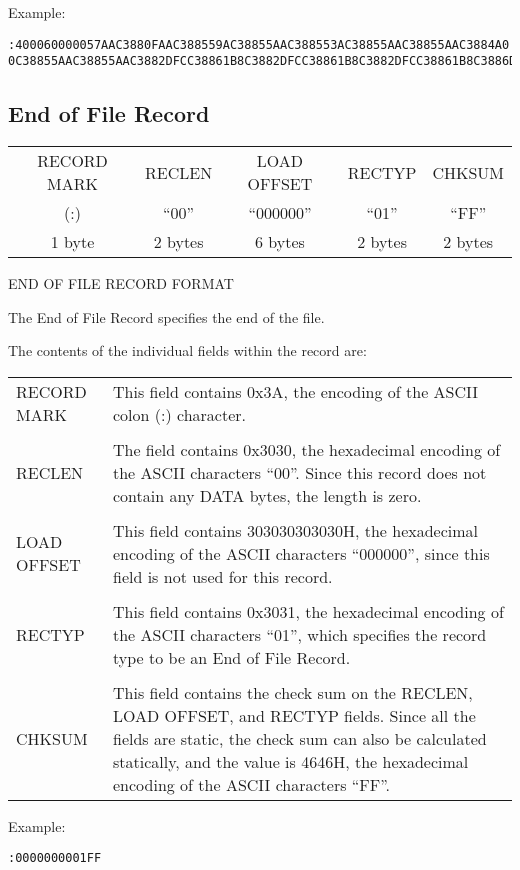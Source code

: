 Example:

\begin{verbatim}
:400060000057AAC3880FAAC388559AC38855AAC388553AC38855AAC38855AAC3884A0
0C38855AAC38855AAC3882DFCC38861B8C3882DFCC38861B8C3882DFCC38861B8C3886D
\end{verbatim}

\subsection{End of File Record}

\begin{center}
\begin{tabular}{| c | c | c | c | c |}
\hline
RECORD MARK & RECLEN & LOAD OFFSET & RECTYP & CHKSUM \\
(:) & ``00'' & ``000000'' & ``01'' & ``FF''  \\
\hline
1 byte & 2 bytes & 6 bytes & 2 bytes & 2 bytes \\
\hline
\end{tabular}

END OF FILE RECORD FORMAT
\end{center}

The End of File Record specifies the end of the file.

The contents of the individual fields within the record are:

\begin{tabular}{l p{10cm}}
RECORD MARK & This field contains 0x3A, the encoding of the ASCII colon (:) character. \\
& \\
RECLEN & The field contains 0x3030, the hexadecimal encoding of the ASCII characters ``00''. Since this record does not contain any DATA bytes, the length is zero. \\
& \\
LOAD OFFSET & This field contains 303030303030H, the hexadecimal encoding of the ASCII characters ``000000'', since this field is not used for this record. \\
& \\
RECTYP & This field contains 0x3031, the hexadecimal encoding of the ASCII characters ``01'', which specifies the record type to be an End of File Record. \\
& \\
CHKSUM & This field contains the check sum on the RECLEN, LOAD OFFSET, and RECTYP fields. Since all the fields are static, the check sum can also be calculated statically, and the value is 4646H, the hexadecimal encoding of the ASCII characters ``FF''. \\
\end{tabular}

Example:

\begin{verbatim}
:0000000001FF
\end{verbatim}

